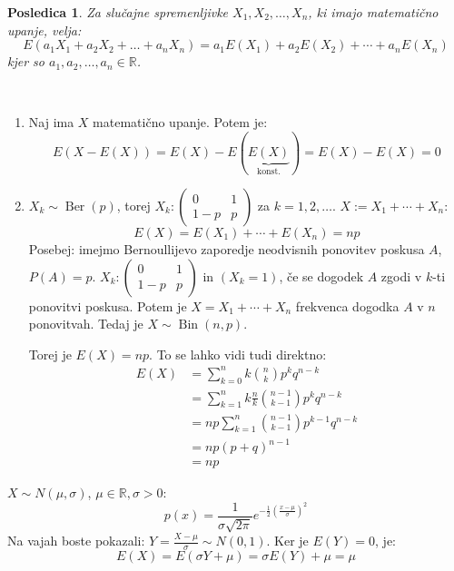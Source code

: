 \documentclass[12pt]{book}
\theoremstyle{definition}
\theoremstyle{plain}
\theoremstyle{plain}
\theoremstyle{plain}
\newtheorem{posledica}{Posledica}
\theoremstyle{remark}
\begin{document}
\begin{posledica}
    Za slučajne spremenljivke $X_1, X_2, \ldots, X_n$, ki imajo matematično upanje, velja: 
    $$
    E\left(a_1 X_1+a_2 X_2+\ldots+a_n X_n\right)=a_1 E\left(X_1\right)+a_2 E \left(X_2\right)+\cdots+a_n E\left(X_n\right)
    $$
    kjer so $a_1, a_2, \ldots, a_n \in \mathbb{R}$.
\end{posledica}

\begin{zgled}
    ~

    \begin{enumerate}
        \item Naj ima $X$ matematično upanje. Potem je: 
        $$
        E(X-E(X))=E(X)-E(\underbrace{E(X)}_{\text{konst.}})=E(X)-E(X)=0
        $$
        \item $X_k \sim \operatorname{Ber}(p)$, torej $X_k:\left(\begin{array}{cc}0 & 1 \\1-p & p\end{array}\right)$ za $k=1, 2, \ldots$. $X:=X_1+ \cdots +X_n$:
        $$
        E(X)=E\left(X_1\right)+\cdots+E\left(X_n\right)=n p
        $$
        Posebej: imejmo Bernoullijevo zaporedje neodvisnih ponovitev poskusa $A$, $P(A)=p$. $X_k:\left(\begin{array}{cc}0 & 1 \\1-p & p\end{array}\right)$ in $(X_k=1)$, če se dogodek $A$ zgodi v $k$-ti ponovitvi poskusa. Potem je $X=X_1+\cdots+X_n$ frekvenca dogodka $A$ v $n$ ponovitvah. Tedaj je $X \sim \operatorname{Bin}(n,p)$.

        Torej je $E(X)=n p$. To se lahko vidi tudi direktno: 
        $$
        \begin{aligned}
            E(X)&=\sum_{k=0}^n k \binom{n}{k} p^k q^{n-k} \\
            &=\sum_{k=1}^n k  \frac{n}{k} \binom{n-1}{k-1} p^k q^{n-k} \\
            &=np \sum_{k=1}^n\binom{n-1}{k-1} p^{k-1} q^{n-k} \\
            &=n p (p+q)^{n-1} \\
            &= np
        \end{aligned}
        $$
    \end{enumerate}
\end{zgled}

\begin{zgled}
    $X \sim N(\mu, \sigma)$, $\mu \in \mathbb{R}, \sigma>0$:
    $$
    p(x)=\frac{1}{\sigma \sqrt{2 \pi}} e^{-\frac{1}{2}\left(\frac{x-\mu}{\sigma}\right)^2}
    $$
    Na vajah boste pokazali: $Y=\frac{X-\mu}{\sigma} \sim N(0,1)$. Ker je $E(Y) = 0$, je:
    $$
    E(X)=E(\sigma Y+\mu) = \sigma E(Y)+\mu=\mu
    $$
\end{zgled}
\end{document}
